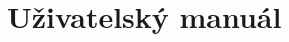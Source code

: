 \documentclass[twoside,project]{../MFFPrace}
\begin{document}
    \maketitle
    \appendix
    \setcounter{chapter}{1}
    \chapter{Uživatelský manuál}
\end{document}
